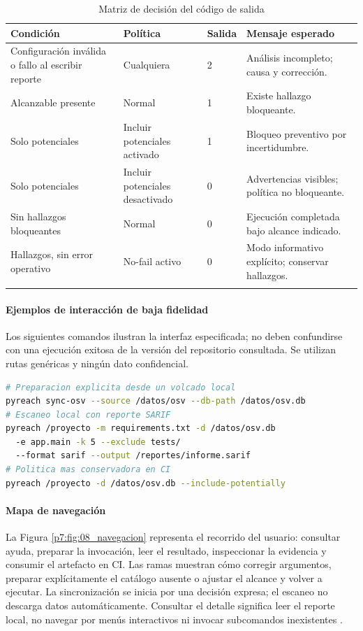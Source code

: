 \begin{table}[H]
\centering\small{}
\caption{Matriz de decisión del código de salida}
\begin{tabularx}{\textwidth}{YP{3.2cm}P{1.4cm}Y}
\toprule
\textbf{Condición} & \textbf{Política} & \textbf{Salida} & \textbf{Mensaje esperado} \\
\midrule
Configuración inválida o fallo al escribir reporte & Cualquiera & 2 & Análisis incompleto; causa y corrección. \\
\addlinespace
Alcanzable presente & Normal & 1 & Existe hallazgo bloqueante. \\
\addlinespace
Solo potenciales & Incluir potenciales activado & 1 & Bloqueo preventivo por incertidumbre. \\
\addlinespace
Solo potenciales & Incluir potenciales desactivado & 0 & Advertencias visibles; política no bloqueante. \\
\addlinespace
Sin hallazgos bloqueantes & Normal & 0 & Ejecución completada bajo alcance indicado. \\
\addlinespace
Hallazgos, sin error operativo & No-fail activo & 0 & Modo informativo explícito; conservar hallazgos. \\
\addlinespace
\bottomrule
\end{tabularx}
\end{table}


\paragraph*{Ejemplos de interacción de baja fidelidad}
Los siguientes comandos ilustran la interfaz especificada; no deben confundirse con una ejecución exitosa de la versión del repositorio consultada. Se utilizan rutas genéricas y ningún dato confidencial.
\begin{lstlisting}[language=bash]
# Preparacion explicita desde un volcado local
pyreach sync-osv --source /datos/osv --db-path /datos/osv.db
# Escaneo local con reporte SARIF
pyreach /proyecto -m requirements.txt -d /datos/osv.db 
  -e app.main -k 5 --exclude tests/ 
  --format sarif --output /reportes/informe.sarif
# Politica mas conservadora en CI
pyreach /proyecto -d /datos/osv.db --include-potentially
\end{lstlisting}

\paragraph*{Mapa de navegación}
La Figura \ref{p7:fig:08_navegacion} representa el recorrido del usuario: consultar ayuda, preparar la invocación, leer el resultado, inspeccionar la evidencia y consumir el artefacto en CI. Las ramas muestran cómo corregir argumentos, preparar explícitamente el catálogo ausente o ajustar el alcance y volver a ejecutar. La sincronización se inicia por una decisión expresa; el escaneo no descarga datos automáticamente. Consultar el detalle significa leer el reporte local, no navegar por menús interactivos ni invocar subcomandos inexistentes \parencite{openssf2023osv,humble2010continuous}.

